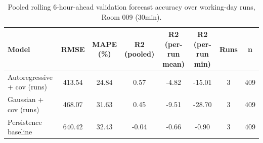 \begin{table}[ht]
\centering
\begin{tabular}{lccccccc}
\hline
Model & RMSE & MAPE (\%) & R2 (pooled) & R2 (per-run mean) & R2 (per-run min) & Runs & n \\
\hline
Autoregressive + cov (runs) & 413.54 & 24.84 & 0.57 & -4.82 & -15.01 & 3 & 409 \\
Gaussian + cov (runs) & 468.07 & 31.63 & 0.45 & -9.51 & -28.70 & 3 & 409 \\
Persistence baseline & 640.42 & 32.43 & -0.04 & -0.66 & -0.90 & 3 & 409 \\
\hline
\end{tabular}
\caption{Pooled rolling 6-hour-ahead validation forecast accuracy over working-day runs, Room 009 (30min).}
\label{tab:week5-validation-forecast-runs}
\end{table}
